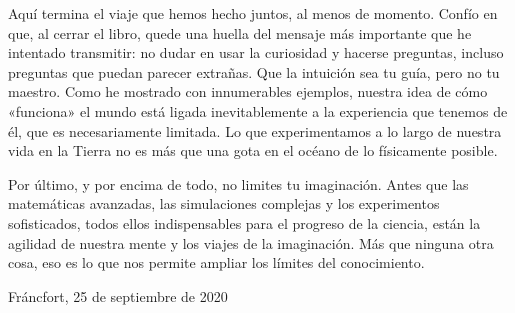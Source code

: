Aquí termina el viaje que hemos hecho juntos, al menos de momento. Confío en que, al cerrar el libro, quede una huella del mensaje más importante que he intentado transmitir: no dudar en usar la curiosidad y hacerse preguntas, incluso preguntas que puedan parecer extrañas. Que la intuición sea tu guía, pero no tu maestro. Como he mostrado con innumerables ejemplos, nuestra idea de cómo «funciona» el mundo está ligada inevitablemente a la experiencia que tenemos de él, que es necesariamente limitada. Lo que experimentamos a lo largo de nuestra vida en la Tierra no es más que una gota en el océano de lo físicamente posible.

Por último, y por encima de todo, no limites tu imaginación. Antes que las matemáticas avanzadas, las simulaciones complejas y los experimentos sofisticados, todos ellos indispensables para el progreso de la ciencia, están la agilidad de nuestra mente y los viajes de la imaginación. Más que ninguna otra cosa, eso es lo que nos permite ampliar los límites del conocimiento.

Fráncfort, 25 de septiembre de 2020
